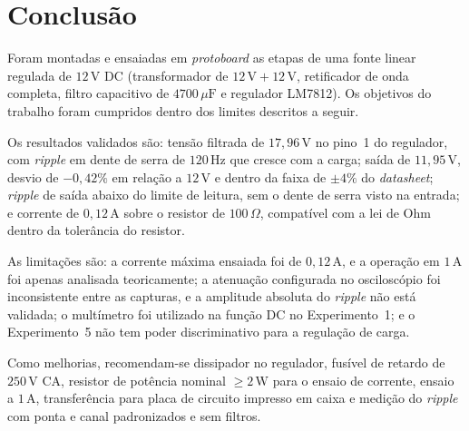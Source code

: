 \section{Conclusão}

Foram montadas e ensaiadas em \textit{protoboard} as etapas de uma fonte linear regulada de $12\,\text{V}$ DC (transformador de $12\,\text{V}+12\,\text{V}$, retificador de onda completa, filtro capacitivo de $4700\,\mu\text{F}$ e regulador LM7812). Os objetivos do trabalho foram cumpridos dentro dos limites descritos a seguir.

Os resultados validados são: tensão filtrada de $17{,}96\,\text{V}$ no pino~1 do regulador, com \textit{ripple} em dente de serra de $120\,\text{Hz}$ que cresce com a carga; saída de $11{,}95\,\text{V}$, desvio de $-0{,}42\%$ em relação a $12\,\text{V}$ e dentro da faixa de $\pm 4\%$ do \textit{datasheet}; \textit{ripple} de saída abaixo do limite de leitura, sem o dente de serra visto na entrada; e corrente de $0{,}12\,\text{A}$ sobre o resistor de $100\,\Omega$, compatível com a lei de Ohm dentro da tolerância do resistor.

As limitações são: a corrente máxima ensaiada foi de $0{,}12\,\text{A}$, e a operação em $1\,\text{A}$ foi apenas analisada teoricamente; a atenuação configurada no osciloscópio foi inconsistente entre as capturas, e a amplitude absoluta do \textit{ripple} não está validada; o multímetro foi utilizado na função DC no Experimento~1; e o Experimento~5 não tem poder discriminativo para a regulação de carga.

Como melhorias, recomendam-se dissipador no regulador, fusível de retardo de $250\,\text{V}$ CA, resistor de potência nominal $\geq 2\,\text{W}$ para o ensaio de corrente, ensaio a $1\,\text{A}$, transferência para placa de circuito impresso em caixa e medição do \textit{ripple} com ponta e canal padronizados e sem filtros.

